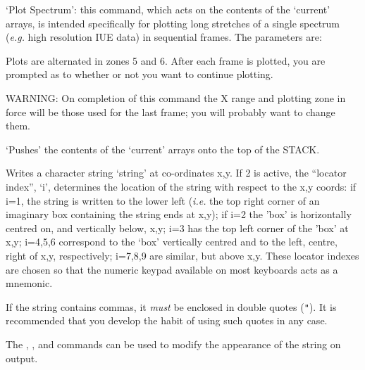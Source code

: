 \begin {description}
`Plot Spectrum': this command, which acts on the contents of the
`current' arrays, is intended specifically for plotting long stretches
of a single spectrum ({\em e.g.} high resolution IUE data) in
sequential frames. The parameters are:

\begin{quote}
\begin{dipdesc}
\end{dipdesc}
\end{quote}

Plots are alternated in zones 5 and 6. After each frame is plotted,
you are prompted as to whether or not you want to continue plotting.

WARNING: On completion of this command the X range and plotting zone
in force will be those used for the last frame; you will probably want
to change them.

`Pushes' the contents of the `current' arrays onto the top of the STACK.

Writes a character string `string' at co-ordinates x,y. If   2 is
active, the ``locator index'', `i', determines the location of the
string with respect to the x,y coords: if i=1, the string is written
to the lower left ({\em i.e.} the top right corner of an imaginary
box containing the string ends at x,y); if i=2 the 'box' is
horizontally centred on, and vertically below, x,y; i=3 has the top
left corner of the 'box' at x,y; i=4,5,6 correspond to the `box'
vertically centred and to the left, centre, right of x,y,
respectively; i=7,8,9 are similar, but above x,y. These locator
indexes are chosen so that the numeric keypad available on most
keyboards acts as a mnemonic.

If the string contains commas, it {\em must} be enclosed in double
quotes ({\tt{"}}).  It is recommended that you develop the habit of
using such quotes in any case.

The ,  ,  and   commands can be used to modify the
appearance of the string on output.


\end{description}
